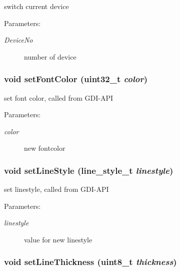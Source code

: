 switch current device 

\begin{Desc}
\item[Parameters:]
\begin{description}
\item[{\em DeviceNo}]number of device \end{description}
\end{Desc}
\hypertarget{group__graphic__device_g3efd6ee7243705cce37b440c68399546}{
\subsubsection[{setFontColor}]{\setlength{\rightskip}{0pt plus 5cm}void setFontColor (uint32\_\-t {\em color})}}
\label{group__graphic__device_g3efd6ee7243705cce37b440c68399546}


set font color, called from GDI-API 

\begin{Desc}
\item[Parameters:]
\begin{description}
\item[{\em color}]new fontcolor \end{description}
\end{Desc}
\hypertarget{group__graphic__device_g457c68dc52c4aed28ac3b53f7325b00d}{
\subsubsection[{setLineStyle}]{\setlength{\rightskip}{0pt plus 5cm}void setLineStyle ({\bf line\_\-style\_\-t} {\em linestyle})}}
\label{group__graphic__device_g457c68dc52c4aed28ac3b53f7325b00d}


set linestyle, called from GDI-API 

\begin{Desc}
\item[Parameters:]
\begin{description}
\item[{\em linestyle}]value for new linestyle \end{description}
\end{Desc}
\hypertarget{group__graphic__device_ge1e3f4164ddb7ede972dfd4573c05739}{
\subsubsection[{setLineThickness}]{\setlength{\rightskip}{0pt plus 5cm}void setLineThickness (uint8\_\-t {\em thickness})}}
\label{group__graphic__device_ge1e3f4164ddb7ede972dfd4573c05739}


